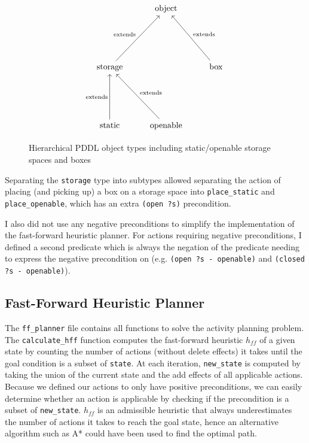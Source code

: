 \documentclass{article}
\begin{document}
\begin{figure}[h]
    \[\begin{tikzcd}
        & {\text{object}} \\
        \\
        \\
        {\text{storage}} && {\text{box}} \\
        \\
        \\
        {\text{static}} & {\text{openable}}
        \arrow["{\text{extends}}", from=4-1, to=1-2]
        \arrow["{\text{extends}}"', from=4-3, to=1-2]
        \arrow["{\text{extends}}"', from=7-2, to=4-1]
        \arrow["{\text{extends}}", from=7-1, to=4-1]
    \end{tikzcd}\]

    \caption{Hierarchical PDDL object types including static/openable storage spaces and boxes}
    \label{fig:types}
\end{figure}

Separating the \texttt{storage} type into subtypes allowed separating the action of placing (and picking up) a box on a storage space into \texttt{place\_static} and \texttt{place\_openable}, which has an extra \texttt{(open ?s)} precondition.

I also did not use any negative preconditions to simplify the implementation of the fast-forward heuristic planner. For actions requiring negative preconditions, I defined a second predicate which is always the negation of the predicate needing to express the negative precondition on (e.g. \texttt{(open ?s - openable)} and \texttt{(closed ?s - openable)}).

\subsection{Fast-Forward Heuristic Planner}

The \texttt{ff\_planner} file contains all functions to solve the activity planning problem. The \texttt{calculate\_hff} function computes the fast-forward heuristic $h_{ff}$ of a given state by counting the number of actions (without delete effects) it takes until the goal condition is a subset of \texttt{state}. At each iteration, \texttt{new\_state} is computed by taking the union of the current state and the add effects of all applicable actions. Because we defined our actions to only have positive preconditions, we can easily determine whether an action is applicable by checking if the precondition is a subset of \texttt{new\_state}. $h_{ff}$ is an admissible heuristic that always underestimates the number of actions it takes to reach the goal state, hence an alternative algorithm such as A* could have been used to find the optimal path.
\end{document}
